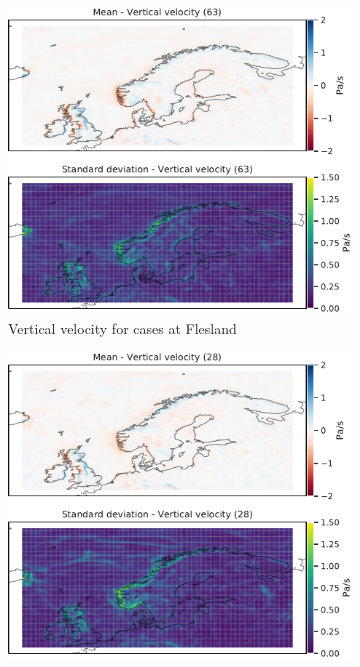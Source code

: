 \begin{figure}
     \centering
     \begin{subfigure}[b]{0.49\textwidth}
         \centering
         \includegraphics[width=\textwidth]{Figures/WENBR.pdf}
         \caption{Vertical velocity for cases at Flesland}
         \label{fig:ENBRW}
     \end{subfigure}
     \hfill
     \begin{subfigure}[b]{0.49\textwidth}
         \centering
         \includegraphics[width=\textwidth]{Figures/WENZV.pdf}

\end{subfigure}
\end{figure}
